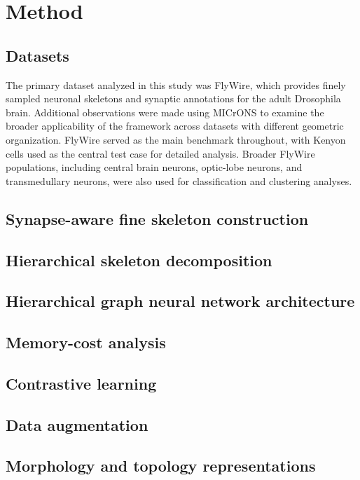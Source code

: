 \documentclass{article}
\begin{document}
\section{Method}

\subsection{Datasets}

The primary dataset analyzed in this study was FlyWire, which provides finely sampled neuronal skeletons and synaptic annotations for the adult Drosophila brain. Additional observations were made using MICrONS to examine the broader applicability of the framework across datasets with different geometric organization. FlyWire served as the main benchmark throughout, with Kenyon cells used as the central test case for detailed analysis. Broader FlyWire populations, including central brain neurons, optic-lobe neurons, and transmedullary neurons, were also used for classification and clustering analyses.

\subsection{Synapse-aware fine skeleton construction}

\subsection{Hierarchical skeleton decomposition}

\subsection{Hierarchical graph neural network architecture}

\subsection{Memory-cost analysis}

\subsection{Contrastive learning}

\subsection{Data augmentation}

\subsection{Morphology and topology representations}
\end{document}
